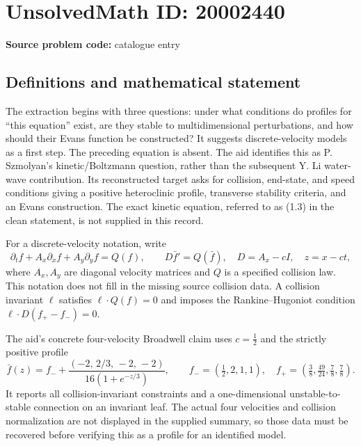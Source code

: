 \documentclass[11pt]{article}
\begin{document}
\section*{UnsolvedMath ID: 20002440}
\textbf{Source problem code:} catalogue entry
\subsection{Definitions and mathematical statement}
The extraction begins with three questions: under what conditions do profiles for ``this equation'' exist, are they stable to multidimensional perturbations, and how should their Evans function be constructed? It suggests discrete-velocity models as a first step. The preceding equation is absent. The aid identifies this as P. Szmolyan's kinetic/Boltzmann question, rather than the subsequent Y. Li water-wave contribution. Its reconstructed target asks for collision, end-state, and speed conditions giving a positive heteroclinic profile, transverse stability criteria, and an Evans construction. The exact kinetic equation, referred to as (1.3) in the clean statement, is not supplied in this record.

For a discrete-velocity notation, write
\[
\partial_t f+A_x\partial_x f+A_y\partial_y f=Q(f),\qquad
D\bar f'=Q(\bar f),\quad D=A_x-cI,\quad z=x-ct,
\]
where $A_x,A_y$ are diagonal velocity matrices and $Q$ is a specified collision law. This notation does not fill in the missing source collision data. A collision invariant $\ell$ satisfies $\ell\cdot Q(f)=0$ and imposes the Rankine--Hugoniot condition $\ell\cdot D(f_+-f_-)=0$.

The aid's concrete four-velocity Broadwell claim uses $c=\tfrac12$ and the strictly positive profile
\[
\bar f(z)=f_-+\frac{(-2,\,2/3,\,-2,\,-2)}{16(1+e^{-z/3})},\qquad
f_-=(\tfrac12,2,1,1),\quad
f_+=(\tfrac38,\tfrac{49}{24},\tfrac78,\tfrac78).
\]
It reports all collision-invariant constraints and a one-dimensional unstable-to-stable connection on an invariant leaf. The actual four velocities and collision normalization are not displayed in the supplied summary, so those data must be recovered before verifying this as a profile for an identified model.
\end{document}
